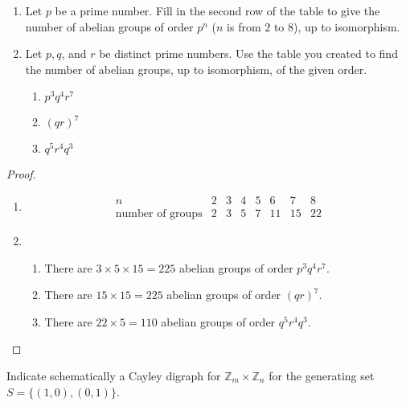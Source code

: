 \newpage
\begin{exercise}
    \begin{enumerate}[label={\textbf{\alph*.}}]
        \item Let $p$ be a prime number. Fill in the second row of the table to give the number of abelian groups of order $p^{n}$ ($n$ is from $2$ to $8$), up to isomorphism.
        \item Let $p, q$, and $r$ be distinct prime numbers. Use the table you created to find the number of abelian groups, up to isomorphism, of the given order.
              \begin{enumerate}[label={\textbf{\roman*.}}]
                  \item $p^{3}q^{4}r^{7}$
                  \item ${(qr)}^{7}$
                  \item $q^{5}r^{4}q^{3}$
              \end{enumerate}
    \end{enumerate}
\end{exercise}

\begin{proof}
    \begin{enumerate}[label={\textbf{\alph*.}}]
        \item
              \[
                  \begin{array}{r|r|r|r|r|r|r|r|}
                      n                       & 2 & 3 & 4 & 5 & 6  & 7  & 8  \\
                      \hline
                      \text{number of groups} & 2 & 3 & 5 & 7 & 11 & 15 & 22
                  \end{array}
              \]
        \item
              \begin{enumerate}[label={\textbf{\roman*.}}]
                  \item There are $3\times 5\times 15 = 225$ abelian groups of order $p^{3}q^{4}r^{7}$.
                  \item There are $15\times 15 = 225$ abelian groups of order ${(qr)}^{7}$.
                  \item There are $22\times 5 = 110$ abelian groups of order $q^{5}r^{4}q^{3}$.
              \end{enumerate}
    \end{enumerate}
\end{proof}

\newpage
\begin{exercise}
    Indicate schematically a Cayley digraph for $\mathbb{Z}_{m}\times \mathbb{Z}_{n}$ for the generating set $S = \{ (1,0), (0,1) \}$.
\end{exercise}

